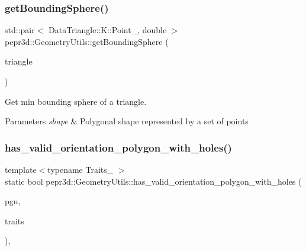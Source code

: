 \subsubsection{\texorpdfstring{getBoundingSphere()}{getBoundingSphere()}\hspace{0.1cm}{\footnotesize\ttfamily [3/3]}}
{\footnotesize\ttfamily std\+::pair$<$ Data\+Triangle\+::\+K\+::\+Point\+\_, double $>$ pepr3d\+::\+Geometry\+Utils\+::get\+Bounding\+Sphere (\begin{DoxyParamCaption}\item[{const Data\+Triangle\+::\+Triangle \&}]{triangle }\end{DoxyParamCaption})\hspace{0.3cm}{\ttfamily [static]}}



Get min bounding sphere of a triangle. 


\begin{DoxyParams}{Parameters}
{\em shape} & Polygonal shape represented by a set of points \\
\hline
\end{DoxyParams}
\mbox{\label{classpepr3d_1_1_geometry_utils_a0a4acf058ecff218c2f64cb92f6a4090}} 
\subsubsection{\texorpdfstring{has\_valid\_orientation\_polygon\_with\_holes()}{has\_valid\_orientation\_polygon\_with\_holes()}}
{\footnotesize\ttfamily template$<$typename Traits\+\_ $>$ \\
static bool pepr3d\+::\+Geometry\+Utils\+::has\+\_\+valid\+\_\+orientation\+\_\+polygon\+\_\+with\+\_\+holes (\begin{DoxyParamCaption}\item[{const typename Traits\+\_\+2\+::\+Polygon\+\_\+with\+\_\+holes\+\_\+2 \&}]{pgn,  }\item[{const Traits\+\_\+2 \&}]{traits }\end{DoxyParamCaption})\hspace{0.3cm}{\ttfamily [inline]}, {\ttfamily [static]}}

